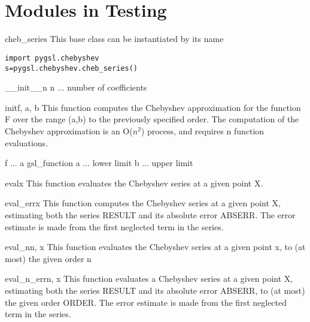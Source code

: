\chapter[\protect\module{pygsl.chebyshev} ---  Modules in Testing]
{\protect{} \\ Modules in Testing}
\label{cha:statistics-module}


\begin{classdesc}{cheb_series}{}
  This base class can be instantiated by its name
\end{classdesc}
\begin{verbatim}
import pygsl.chebyshev
s=pygsl.chebyshev.cheb_series()
\end{verbatim}

\begin{methoddesc}{__init__}{n}
            n ... number of coefficients        
\end{methoddesc}
\begin{methoddesc}{init}{f, a, b}
        This function computes the Chebyshev approximation for the
        function F over the range (a,b) to the previously specified order.
        The computation of the Chebyshev approximation is an O($n^2$)
        process, and requires n function evaluations.

            f ... a gsl_function
            a ... lower limit
            b ... upper limit
        
\end{methoddesc}
\begin{methoddesc}{eval}{x}
        This function evaluates the Chebyshev series at a given point X.
\end{methoddesc}
\begin{methoddesc}{eval_err}{x}
         This function computes the Chebyshev series  at a given point X,
         estimating both the series RESULT and its absolute error ABSERR.
         The error estimate is made from the first neglected term in the
         series.
\end{methoddesc}
\begin{methoddesc}{eval_n}{n, x}
         This function evaluates the Chebyshev series at a given point
         x, to (at most) the given order n
\end{methoddesc}
\begin{methoddesc}{eval_n_err}{n, x}
        This function evaluates a Chebyshev series at a given point X,
        estimating both the series RESULT and its absolute error ABSERR,
        to (at most) the given order ORDER.  The error estimate is made
        from the first neglected term in the series.
\end{methoddesc}

